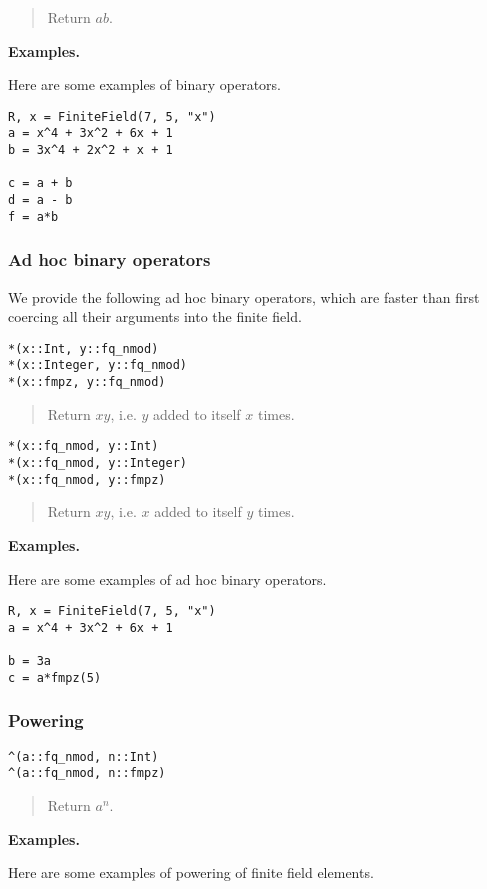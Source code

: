 \documentclass[a4paper,10pt]{article}
\newcommand{\desc}[1]{\vspace{-3mm}\begin{quote}#1\end{quote}}
\begin{document}
{{\desc{Return $ab$.}

\textbf{Examples.}

Here are some examples of binary operators.

\begin{lstlisting}
R, x = FiniteField(7, 5, "x")
a = x^4 + 3x^2 + 6x + 1
b = 3x^4 + 2x^2 + x + 1

c = a + b
d = a - b
f = a*b
\end{lstlisting}

\subsubsection{Ad hoc binary operators}

We provide the following ad hoc binary operators, which are faster than first
coercing all their arguments into the finite field.

\begin{lstlisting}
*(x::Int, y::fq_nmod)
*(x::Integer, y::fq_nmod)
*(x::fmpz, y::fq_nmod)
\end{lstlisting}

\desc{Return $xy$, i.e. $y$ added to itself $x$ times.}

\begin{lstlisting}
*(x::fq_nmod, y::Int)
*(x::fq_nmod, y::Integer)
*(x::fq_nmod, y::fmpz)
\end{lstlisting}

\desc{Return $xy$, i.e. $x$ added to itself $y$ times.}

\textbf{Examples.}

Here are some examples of ad hoc binary operators.

\begin{lstlisting}
R, x = FiniteField(7, 5, "x")
a = x^4 + 3x^2 + 6x + 1

b = 3a
c = a*fmpz(5)
\end{lstlisting}

\subsubsection{Powering}

\begin{lstlisting}
^(a::fq_nmod, n::Int)
^(a::fq_nmod, n::fmpz)
\end{lstlisting}

\desc{Return $a^n$.}

\textbf{Examples.}

Here are some examples of powering of finite field elements.

}}
\end{document}
